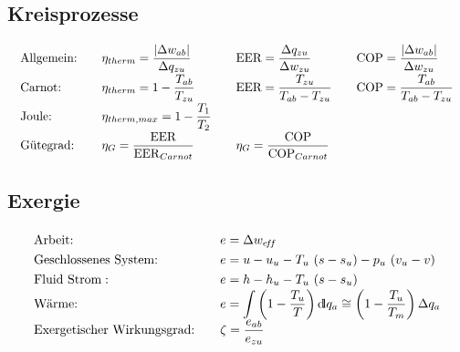 \subsection{Kreisprozesse}
%
	\setlength{\abovedisplayshortskip}{-25pt}
	\[ \arraycolsep=1em \def\arraystretch{1.8}
		\begin{array}{llll}
			\text{Allgemein:} & \eta_{therm} = \dfrac{\abs{\Delta w_{ab}}} {\Delta q_{zu}} & \text{EER} = \dfrac{\Delta q_{zu}}{\Delta w_{zu}}    & \text{COP} = \dfrac{\abs{\Delta w_{ab}}}{\Delta w_{zu}} \\
			\text{Carnot:}    & \eta_{therm} = 1- \dfrac{T_{ab}}{T_{zu}}                   & \text{EER} = \dfrac{T_{zu}}{T_{ab} - T_{zu}}         & \text{COP} = \dfrac{T_{ab}}{T_{ab} - T_{zu}}            \\
			\text{Joule:}     & \eta_{therm,max} = 1 - \dfrac{T_1}{T_2}                    &                                                      &                                                         \\
			\text{Gütegrad:}  & \eta_G = \dfrac{\mathrm{EER}}{\mathrm{EER}_{Carnot}}       & \eta_G = \dfrac{\mathrm{COP}}{\mathrm{COP}_{Carnot}} &
		\end{array} \]

\subsection{Exergie}

	\hspace{3cm}
	\setlength{\abovedisplayshortskip}{-20pt}
	\[ \arraycolsep=1em \def\arraystretch{1.3}
		\begin{array}{ll}
			\text{Arbeit:}                     & e = \Delta w_{\eff}                                                                                                       \\
			\text{Geschlossenes System:}       & e = u - u_u - T_u\ (s-s_u) - p_u\ (v_u-v)                                                                                \\
			\text{Fluid Strom}:                & e = h - h_u - T_u\ (s-s_u)                                                                                               \\
			\text{Wärme:}                      & e = \mathop{\mathlarger{\int}} \left(1-\dfrac{T_u}{T} \right) \dd q_a  \cong \left(1-\dfrac{T_u}{T_m} \right) \Delta q_a \\
			\text{Exergetischer Wirkungsgrad:} & \zeta = \dfrac{e_{ab}}{e_{zu}}
		\end{array} \]
